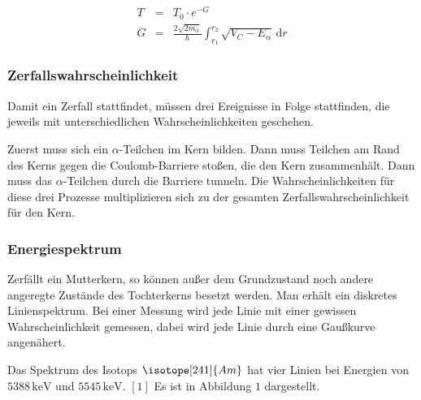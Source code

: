 \documentclass[12pt,a4paper]{scrartcl}
\numberwithin{equation}{section} %
\renewcommand{\[}{} %
\renewcommand{\]}{\noindent} %
\begin{document}
\[
\begin{eqnarray}
    T &=& T_0 \cdot e^{-G} \\
    G &=&
        \frac{2\sqrt{2m_\alpha}}{\hbar}
        \int_{r_{1}}^{r_{2}}\sqrt{V_{C}-E_{\alpha}}
        \,\mathrm dr
\end{eqnarray}
\]

\hypertarget{zerfallswahrscheinlichkeit}{%
\subsubsection{Zerfallswahrscheinlichkeit}\label{zerfallswahrscheinlichkeit}}

Damit ein Zerfall stattfindet, müssen drei Ereignisse in Folge
stattfinden, die jeweils mit unterschiedlichen Wahrscheinlichkeiten
geschehen.

Zuerst muss sich ein \(\alpha\)-Teilchen im Kern bilden. Dann muss
Teilchen am Rand des Kerns gegen die Coulomb-Barriere stoßen, die den
Kern zusammenhält. Dann muss das \(\alpha\)-Teilchen durch die Barriere
tunneln. Die Wahrscheinlichkeiten für diese drei Prozesse multiplizieren
sich zu der gesamten Zerfallswahrscheinlichkeit für den Kern.

\hypertarget{energiespektrum}{%
\subsubsection{Energiespektrum}\label{energiespektrum}}

Zerfällt ein Mutterkern, so können außer dem Grundzustand noch andere
angeregte Zustände des Tochterkerns besetzt werden. Man erhält ein
diskretes Linienspektrum. Bei einer Messung wird jede Linie mit einer
gewissen Wahrscheinlichkeit gemessen, dabei wird jede Linie durch eine
Gaußkurve angenähert.

Das Spektrum des Isotops \(\isotope [241]{Am}\) hat vier Linien bei
Energien von \(5388\mathrm{\,keV}\) und \(5545\mathrm{\,keV}\). \([1]\) Es ist in Abbildung $1$ dargestellt.
\end{document}
